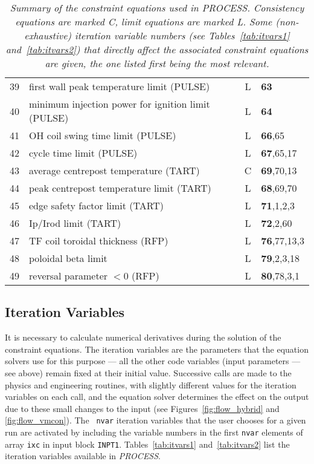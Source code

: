 \documentclass[11pt,a4paper]{report}
\makeatletter
\newcommand{\PSD}{\mbox{\it PROCESS}\@.\/ }
\makeatother
\begin{document}
\begin{table}[tbph]
\begin{center}
\begin{tabular}{||c|l|c|l||}
39  & first wall peak temperature limit (PULSE)           & L    & {\bf 63} \\
40  & minimum injection power for ignition limit (PULSE)  & L    & {\bf 64} \\
41  & OH coil swing time limit (PULSE)                    & L    & {\bf 66},65 \\
42  & cycle time limit (PULSE)                            & L    & {\bf 67},65,17 \\
43  & average centrepost temperature (TART)               & C    & {\bf 69},70,13 \\
44  & peak centrepost temperature limit (TART)            & L    & {\bf 68},69,70 \\
45  & edge safety factor limit    (TART)                  & L    & {\bf 71},1,2,3 \\
46  & Ip/Irod limit               (TART)                  & L    & {\bf 72},2,60 \\
47  & TF coil toroidal thickness  (RFP)                   & L    & {\bf 76},77,13,3 \\
48  & poloidal beta limit                                 & L    & {\bf 79},2,3,18 \\
49  & reversal parameter $< 0$ (RFP)                      & L    & {\bf 80},78,3,1 \\ \hline
\end{tabular}
\end{center}
\caption[TABLE_EQNS]{{\it
Summary of the constraint equations used in \PSD Consistency equations are
marked C, limit equations are marked L\@. Some (non-exhaustive) iteration
variable numbers (see Tables~\ref{tab:itvars1} and~\ref{tab:itvars2}) that
directly affect the associated constraint equations are given, the one listed
first being the most relevant.  }}
\label{tab:eqns}
\end{table}
\normalsize


\subsection{Iteration Variables}
\label{sec:itvars}

It is necessary to calculate numerical derivatives during the solution of the
constraint equations. The iteration variables are the parameters that the
equation solvers use for this purpose --- all the other code variables (input
parameters --- see above) remain fixed at their initial value. Successive
calls are made to the physics and engineering routines, with slightly
different values for the iteration variables on each call, and the equation
solver determines the effect on the output due to these small changes to the
input (see Figures~\ref{fig:flow_hybrid} and \ref{fig:flow_vmcon}). The {\tt
nvar} iteration variables that the user chooses for a given run are activated
by including the variable numbers in the first {\tt nvar} elements of array
{\tt ixc} in input block {\tt INPT1}. Tables~\ref{tab:itvars1}
and~\ref{tab:itvars2} list the iteration variables available in \PSD
\end{document}
